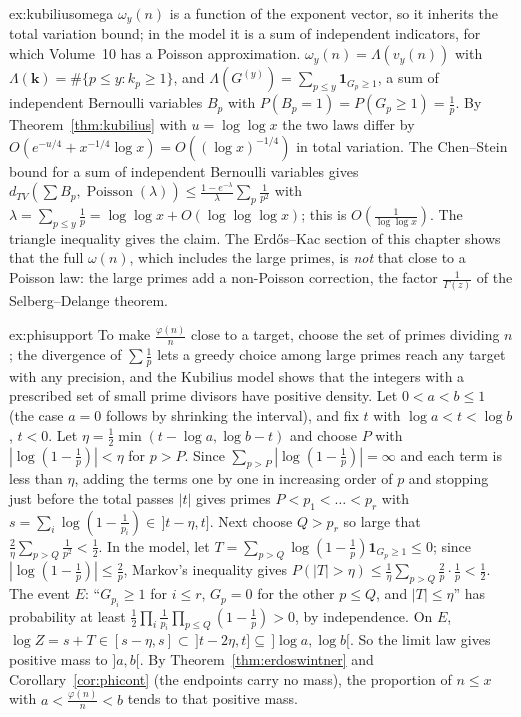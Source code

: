 \begin{solution}{ex:kubiliusomega}
\idea $\omega_y(n)$ is a function of the exponent vector, so it inherits the total variation bound; in the model it is a sum of independent indicators, for which Volume~10 has a Poisson approximation.
\writeup $\omega_y(n)=\Lambda(v_y(n))$ with $\Lambda(\mathbf k)=\#\{p\le y:k_p\ge1\}$, and $\Lambda(G^{(y)})=\sum_{p\le y}\mathbf 1_{G_p\ge1}$, a sum of independent Bernoulli variables $B_p$ with $P(B_p=1)=P(G_p\ge1)=\frac1p$. By Theorem~\ref{thm:kubilius} with $u=\log\log x$ the two laws differ by $O(e^{-u/4}+x^{-1/4}\log x)=O((\log x)^{-1/4})$ in total variation. The Chen--Stein bound for a sum of independent Bernoulli variables gives $d_{TV}(\sum B_p,\operatorname{Poisson}(\lambda))\le\frac{1-e^{-\lambda}}\lambda\sum_p\frac1{p^2}$ with $\lambda=\sum_{p\le y}\frac1p=\log\log x+O(\log\log\log x)$; this is $O(\frac1{\log\log x})$. The triangle inequality gives the claim. The Erd\H{o}s--Kac section of this chapter shows that the full $\omega(n)$, which includes the large primes, is \emph{not} that close to a Poisson law: the large primes add a non-Poisson correction, the factor $\frac1{\Gamma(z)}$ of the Selberg--Delange theorem.
\end{solution}

\begin{solution}{ex:phisupport}
\idea To make $\frac{\varphi(n)}n$ close to a target, choose the set of primes dividing $n$; the divergence of $\sum\frac1p$ lets a greedy choice among large primes reach any target with any precision, and the Kubilius model shows that the integers with a prescribed set of small prime divisors have positive density.
\writeup Let $0<a<b\le1$ (the case $a=0$ follows by shrinking the interval), and fix $t$ with $\log a<t<\log b$, $t<0$. Let $\eta=\frac12\min(t-\log a,\log b-t)$ and choose $P$ with $|\log(1-\frac1p)|<\eta$ for $p>P$. Since $\sum_{p>P}|\log(1-\frac1p)|=\infty$ and each term is less than $\eta$, adding the terms one by one in increasing order of $p$ and stopping just before the total passes $|t|$ gives primes $P<p_1<\dots<p_r$ with $s=\sum_i\log(1-\frac1{p_i})\in\,]t-\eta,t]$. Next choose $Q>p_r$ so large that $\frac2\eta\sum_{p>Q}\frac1{p^2}<\frac12$. In the model, let $T=\sum_{p>Q}\log(1-\frac1p)\mathbf 1_{G_p\ge1}\le0$; since $|\log(1-\frac1p)|\le\frac2p$, Markov's inequality gives $P(|T|>\eta)\le\frac1\eta\sum_{p>Q}\frac2p\cdot\frac1p<\frac12$. The event $E$: ``$G_{p_i}\ge1$ for $i\le r$, $G_p=0$ for the other $p\le Q$, and $|T|\le\eta$'' has probability at least $\frac12\prod_i\frac1{p_i}\prod_{p\le Q}(1-\frac1p)>0$, by independence. On $E$, $\log Z=s+T\in[s-\eta,s]\subset\,]t-2\eta,t]\subseteq\,]\log a,\log b[$. So the limit law gives positive mass to $]a,b[$. By Theorem~\ref{thm:erdoswintner} and Corollary~\ref{cor:phicont} (the endpoints carry no mass), the proportion of $n\le x$ with $a<\frac{\varphi(n)}n<b$ tends to that positive mass.
\end{solution}


